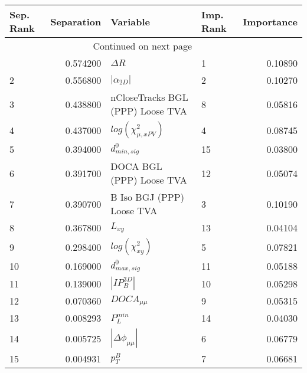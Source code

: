 \usepackage{lscape}

\begin{landscape}
\begin{longtable}{lrllr}
\toprule
Sep. Rank &  Separation &                          Variable & Imp. Rank &  Importance \\
\midrule
\endhead
\midrule
\multicolumn{3}{r}{{Continued on next page}} \\
\midrule
\endfoot

\bottomrule
\endlastfoot
        1 &    0.574200 &                        $\Delta R$ &         1 &     0.10890 \\
        2 &    0.556800 &                   $|\alpha_{2D}|$ &         2 &     0.10270 \\
        3 &    0.438800 &  nCloseTracks BGL (PPP) Loose TVA &         8 &     0.05816 \\
        4 &    0.437000 &         $log(\chi^{2}_{\mu,xPV})$ &         4 &     0.08745 \\
        5 &    0.394000 &                  $d^0_{min, sig}$ &        15 &     0.03800 \\
        6 &    0.391700 &          DOCA BGL (PPP) Loose TVA &        12 &     0.05074 \\
        7 &    0.390700 &         B Iso BGJ (PPP) Loose TVA &         3 &     0.10190 \\
        8 &    0.367800 &                          $L_{xy}$ &        13 &     0.04104 \\
        9 &    0.298400 &              $log(\chi^{2}_{xy})$ &         5 &     0.07821 \\
       10 &    0.169000 &                  $d^0_{max, sig}$ &        11 &     0.05188 \\
       11 &    0.139000 &                   $|IP_{B}^{3D}|$ &        10 &     0.05298 \\
       12 &    0.070360 &                   $DOCA_{\mu\mu}$ &         9 &     0.05315 \\
       13 &    0.008293 &                     $P^{min}_{L}$ &        14 &     0.04030 \\
       14 &    0.005725 &          $|\Delta \phi_{\mu\mu}|$ &         6 &     0.06779 \\
       15 &    0.004931 &                         $p^B_{T}$ &         7 &     0.06681 \\
\end{longtable}

\end{landscape}
